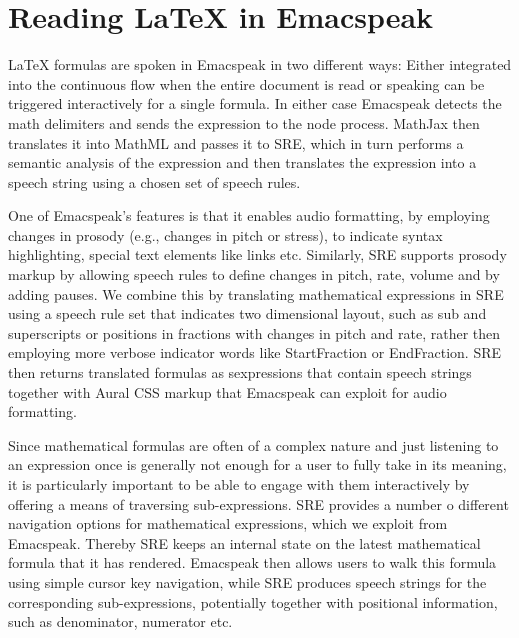 \documentclass{sig-alternate-05-2015}
\newcommand{\sre}{SRE\xspace}
\begin{document}
\section{Reading {\LaTeX} in Emacspeak}
\label{sec:rendering}

{\LaTeX} formulas are spoken in Emacspeak in two different ways: Either
integrated into the continuous flow when the entire document is read or
speaking can be triggered interactively for a single formula. In either case
Emacspeak detects the math delimiters and sends the expression to the node
process. MathJax then translates it into MathML and passes it to \sre, which in
turn performs a semantic analysis of the expression and then translates the
expression into a speech string using a chosen set of speech rules.


One of Emacspeak's features is that it enables audio formatting, by employing
changes in prosody (e.g., changes in pitch or stress), to indicate syntax
highlighting, special text elements like links etc. Similarly, \sre supports
prosody markup by allowing speech rules to define changes in pitch, rate, volume
and by adding pauses. We combine this by translating mathematical expressions in
\sre using a speech rule set that indicates two dimensional layout, such as sub
and superscripts or positions in fractions with changes in pitch and rate,
rather then employing more verbose indicator words like StartFraction or
EndFraction. \sre then returns translated formulas as sexpressions that contain
speech strings together with Aural CSS markup that Emacspeak can exploit for
audio formatting.


Since mathematical formulas are often of a complex nature and just listening to
an expression once is generally not enough for a user to fully take in its
meaning, it is particularly important to be able to engage with them
interactively by offering a means of traversing sub-expressions.  \sre provides
a number o different navigation options for mathematical expressions, which we
exploit from Emacspeak. Thereby \sre keeps an internal state on the latest
mathematical formula that it has rendered. Emacspeak then allows users to walk
this formula using simple cursor key navigation, while \sre produces speech
strings for the corresponding sub-expressions, potentially together with
positional information, such as denominator, numerator etc.
\end{document}
